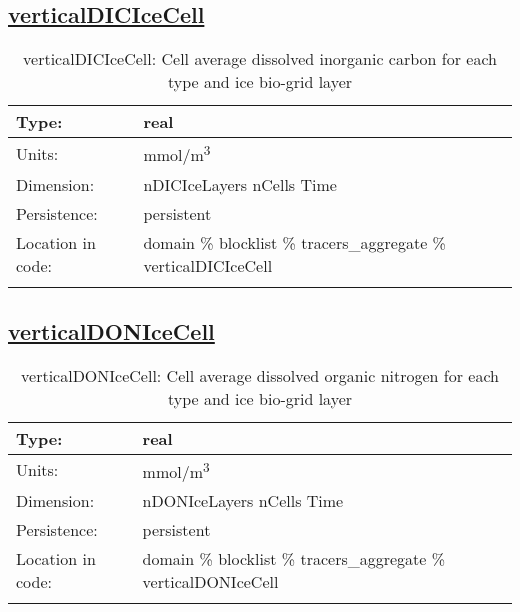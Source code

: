 \subsection[verticalDICIceCell]{\hyperref[sec:var_tab_tracers_aggregate]{verticalDICIceCell}}
\label{subsec:var_sec_tracers_aggregate_verticalDICIceCell}
\begin{center}
\begin{longtable}{| p{2.0in} | p{4.0in} |}
        \hline 
        Type: & real \\
        \hline 
        Units: & \si{mmol/m^3} \\
        \hline 
        Dimension: & nDICIceLayers nCells Time \\
        \hline 
        Persistence: & persistent \\
        \hline 
         Location in code: & domain \% blocklist \% tracers\_aggregate \% verticalDICIceCell \\
         \hline 
    \caption{verticalDICIceCell: Cell average dissolved inorganic carbon for each type and ice bio-grid layer}
\end{longtable}
\end{center}
\subsection[verticalDONIceCell]{\hyperref[sec:var_tab_tracers_aggregate]{verticalDONIceCell}}
\label{subsec:var_sec_tracers_aggregate_verticalDONIceCell}
\begin{center}
\begin{longtable}{| p{2.0in} | p{4.0in} |}
        \hline 
        Type: & real \\
        \hline 
        Units: & \si{mmol/m^3} \\
        \hline 
        Dimension: & nDONIceLayers nCells Time \\
        \hline 
        Persistence: & persistent \\
        \hline 
         Location in code: & domain \% blocklist \% tracers\_aggregate \% verticalDONIceCell \\
         \hline 
    \caption{verticalDONIceCell: Cell average dissolved organic nitrogen for each type and ice bio-grid layer}
\end{longtable}
\end{center}
